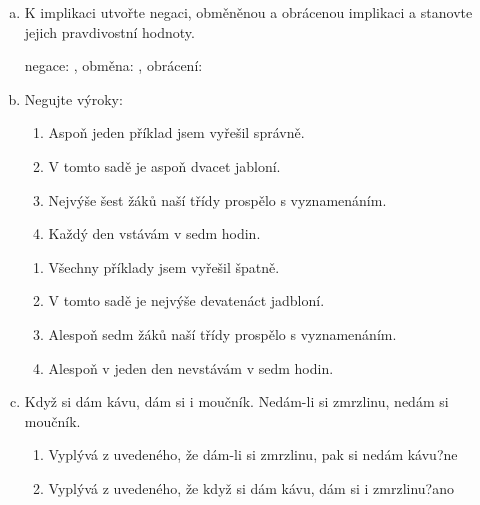 \begin{example}[ŘMÚ 274/28.5]
  \begin{enumerate}[a.]
    \item K implikaci  utvořte negaci, obměněnou a obrácenou implikaci a stanovte jejich pravdivostní hodnoty.

    {\rm negace: , obměna: , obrácení: }
    \item Negujte výroky:
    \begin{enumerate}[1.]
      \item Aspoň jeden příklad jsem vyřešil správně.
      \item V tomto sadě je aspoň dvacet jabloní.
      \item Nejvýše šest žáků naší třídy prospělo s vyznamenáním.
      \item Každý den vstávám v sedm hodin.
    \end{enumerate}
    \vspace{3em}
    {\rm
      \begin{enumerate}[1.]
        \item Všechny příklady jsem vyřešil špatně.
        \item V tomto sadě je nejvýše devatenáct jadbloní.
        \item Alespoň sedm žáků naší třídy prospělo s vyznamenáním.
        \item Alespoň v jeden den nevstávám v sedm hodin.
      \end{enumerate}
    }
    \item Když si dám kávu, dám si i moučník. Nedám-li si zmrzlinu, nedám si moučník.
    \begin{enumerate}[1.]
      \item Vyplývá z uvedeného, že dám-li si zmrzlinu, pak si nedám kávu?\hfill {\rm ne}
      \item Vyplývá z uvedeného, že když si dám kávu, dám si i zmrzlinu?\hfill {\rm ano}
    \end{enumerate}
  \end{enumerate}
\end{example}

